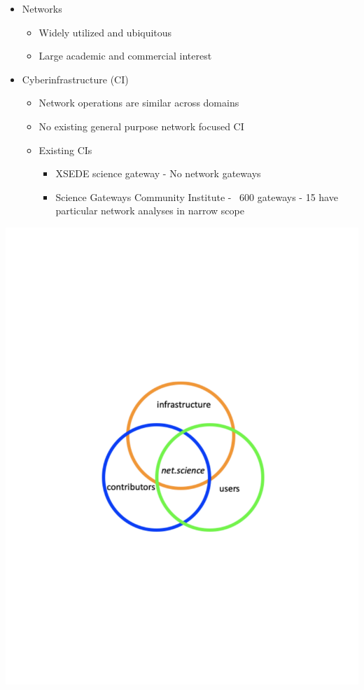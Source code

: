 \documentclass[landscape,paperwidth=70in,paperheight=46in,fontscale=0.225]{baposter} %
\begin{document}
\begin{poster}
{\begin{itemize}[leftmargin=*,noitemsep,topsep=0pt]
\item Networks
	\begin{itemize}
	\item Widely utilized and ubiquitous
	\item Large academic and commercial interest
	\end{itemize}

\item Cyberinfrastructure (CI)
	\begin{itemize}
	\item Network operations are similar across domains
	\item No existing general purpose network focused CI
	\item Existing CIs
	\begin{itemize}
	    \item XSEDE science gateway - No network gateways
	    \item Science Gateways Community Institute - ~600 gateways - 15 have
	    particular network analyses in narrow scope
	\end{itemize}
	\end{itemize}
\end{itemize}

\begin{center}
   \includegraphics[scale=0.2]{figures/motivation.pdf}
   \end{center}

}
\end{poster}
\end{document}
